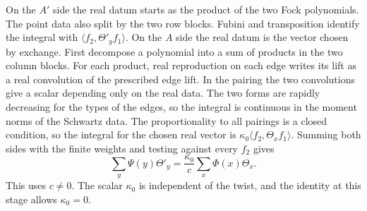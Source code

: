On the \(A'\) side the real datum starts as the product of the two
Fock polynomials. The point data also split by the two row blocks.
Fubini and transposition identify the integral with
\(\langle f_2,\Theta'_y f_1\rangle\). On the \(A\) side the real datum
is the vector chosen by exchange. First decompose a polynomial into
a sum of products in the two column blocks. For each product, real
reproduction on each edge writes its lift as a real convolution of the
prescribed edge lift. In the pairing the two convolutions give a scalar
depending only on the real data. The two forms are rapidly decreasing
for the types of the edges, so the integral is continuous in the moment
norms of the Schwartz data. The proportionality to all pairings is a
closed condition, so the integral for the chosen real vector is
\(\kappa_0\langle f_2,\Theta_x f_1\rangle\).
Summing both sides with the finite weights and testing against every
\(f_2\) gives
\begin{equation}\label{eq:exchange-square}
 \sum_y\Psi(y)\Theta'_y=\frac{\kappa_0}{c}\sum_x\Phi(x)\Theta_x .
\end{equation}
This uses \(c\ne0\). The scalar \(\kappa_0\) is independent of the twist,
and the identity at this stage allows \(\kappa_0=0\).
